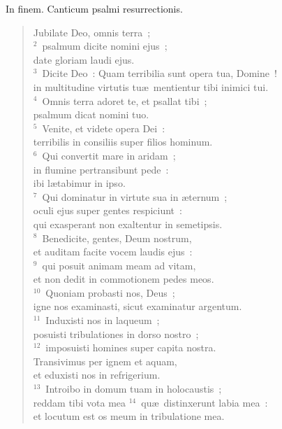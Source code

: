 \lettrine[lines=3,image=true,loversize=0.05,lraise=-0.03]{I}{}n finem. Canticum psalmi resurrectionis. \begin{flushleft}\begin{verse}\vspace{6pt}Jubilate Deo, omnis terra~;\\
${}^{2}$~psalmum dicite nomini ejus~;\\ date gloriam laudi ejus.\\
${}^{3}$~Dicite Deo~: Quam terribilia sunt opera tua, Domine~!\\ in multitudine virtutis tu\ae\ mentientur tibi inimici tui.\\
${}^{4}$~Omnis terra adoret te, et psallat tibi~;\\ psalmum dicat nomini tuo.\\
${}^{5}$~Venite, et videte opera Dei~:\\ terribilis in consiliis super filios hominum.\\
${}^{6}$~Qui convertit mare in aridam~;\\ in flumine pertransibunt pede~:\\ ibi l\ae tabimur in ipso.\\
${}^{7}$~Qui dominatur in virtute sua in \ae ternum~;\\ oculi ejus super gentes respiciunt~:\\ qui exasperant non exaltentur in semetipsis.\\
${}^{8}$~Benedicite, gentes, Deum nostrum,\\ et auditam facite vocem laudis ejus~:\\
${}^{9}$~qui posuit animam meam ad vitam,\\ et non dedit in commotionem pedes meos.\\
${}^{10}$~Quoniam probasti nos, Deus~;\\ igne nos examinasti, sicut examinatur argentum.\\
${}^{11}$~Induxisti nos in laqueum~;\\ posuisti tribulationes in dorso nostro~;\\
${}^{12}$~imposuisti homines super capita nostra.\\ Transivimus per ignem et aquam,\\ et eduxisti nos in refrigerium.\\
${}^{13}$~Introibo in domum tuam in holocaustis~;\\ reddam tibi vota mea
${}^{14}$~qu\ae\ distinxerunt labia mea~:\\ et locutum est os meum in tribulatione mea.\\

\end{verse}
\end{flushleft}
